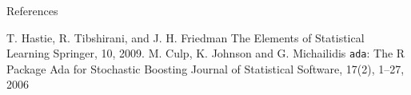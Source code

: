 
\appendix
\begin{frame}[allowframebreaks]{References}
\begin{thebibliography}{9}
	 T. Hastie, R. Tibshirani, and J. H. Friedman
	\newblock The Elements of Statistical Learning
	\newblock Springer, 10, 2009.
	 M. Culp, K. Johnson and G. Michailidis
	\newblock \texttt{ada}: The R Package Ada for Stochastic Boosting
	\newblock Journal of Statistical Software, 17(2), 1–27, 2006
\end{thebibliography}
\end{frame}

